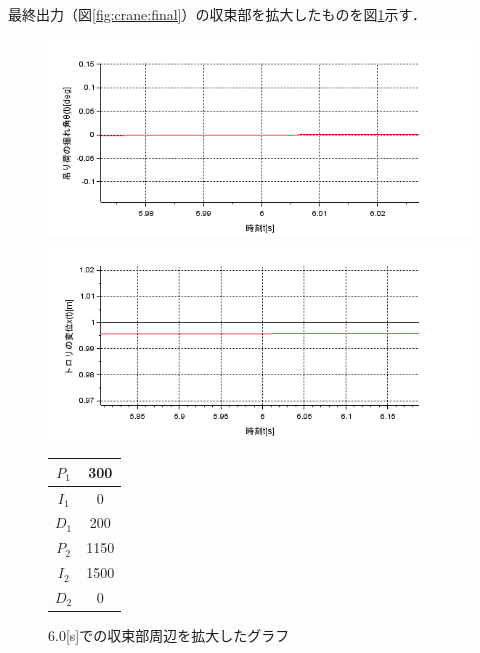 \documentclass[dvipdfmx,titlepage,a4j]{jsarticle}  %
\begin{document}
最終出力（図\ref{fig:crane:final}）の収束部を拡大したものを図\ref{fig:crane:max}示す．

\begin{figure}[H]
  \begin{minipage}{4.5cm}
    \centering
    \includegraphics[keepaspectratio, scale=0.35]{../graph/crane/ang-max.png}
  \end{minipage}
  \hfill
  \begin{minipage}{4.5cm}
    \centering
    \includegraphics[keepaspectratio, scale=0.35]{../graph/crane/po-max.png}
  \end{minipage}
  \hfill
  \begin{minipage}{3cm}
    \begin{center}
      \begin{tabular}{c|c}
        \hline
        $P_1$ & 300  \\ \hline
        $I_1$ & 0    \\ \hline
        $D_1$ & 200  \\ \hline
        $P_2$ & 1150 \\ \hline
        $I_2$ & 1500 \\ \hline
        $D_2$ & 0    \\
        \hline
      \end{tabular}
    \end{center}
  \end{minipage}
  \hfill
  \caption{6.0[s]での収束部周辺を拡大したグラフ}
  \label{fig:crane:max}
\end{figure}
\end{document}
